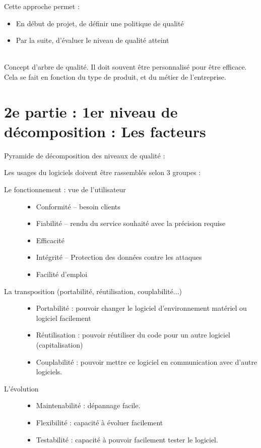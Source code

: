 \hfill

Cette approche permet :
\begin{itemize}
\item En début de projet, de définir une politique de qualité
\item Par la suite, d'évaluer le niveau de qualité atteint
\end{itemize}

\hfill\\

Concept d'arbre de qualité. Il doit souvent être personnalisé pour être efficace. Cela se fait en fonction du type de produit, et du métier de l’entreprise.	 	 	 	

\section{2e partie : 1er niveau de décomposition : Les facteurs}

	 	 	 	
Pyramide de décomposition des niveaux de qualité :


Les usages du logiciels doivent être rassemblés selon 3 groupes :
\begin{description}
\item[Le fonctionnement : vue de l'utilisateur]
	\begin{itemize}
	\item Conformité – besoin clients
	\item Fiabilité – rendu du service souhaité avec la précision requise
	\item Efficacité
	\item Intégrité – Protection des données contre les attaques
	\item Facilité d'emploi
	\end{itemize}
\item[La transposition (portabilité, réutilisation, couplabilité...)]
	\begin{itemize}
	\item Portabilité : pouvoir changer le logiciel d'environnement matériel ou logiciel facilement
	\item Réutilisation : pouvoir réutiliser du code pour un autre logiciel (capitalisation)
	\item Couplabilité : pouvoir mettre ce logiciel en communication avec d'autre logiciels.
	\end{itemize}
\item[L'évolution]
	\begin{itemize}
	\item Maintenabilité : dépannage facile.
	\item Flexibilité : capacité à 	évoluer facilement
	\item Testabilité : capacité à pouvoir facilement tester le logiciel.
	\end{itemize}
\end{description}

